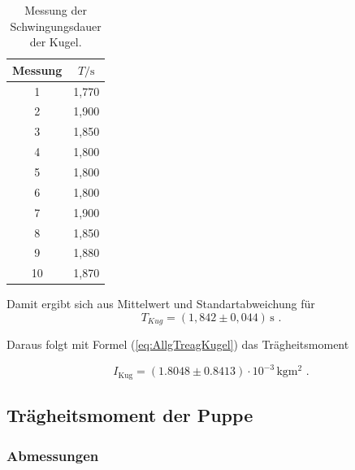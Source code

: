 \begin{table}[H]
  \centering
  \caption{Messung der Schwingungsdauer der Kugel.}
  \label{tab:SchwingungsdauerKugel}
  \begin{tabular}{c c}
    \toprule
    Messung &  $T / \unit\second$ \\
    \midrule
              1 &        1,770 \\
              2 &        1,900 \\
              3 &        1,850 \\
              4 &        1,800 \\
              5 &        1,800 \\
              6 &        1,800 \\
              7 &        1,900 \\
              8 &        1,850 \\
              9 &        1,880 \\
             10 &        1,870 \\
    \bottomrule
    \end{tabular}
\end{table}

Damit ergibt sich aus Mittelwert und Standartabweichung für
\begin{equation*}
  T_{Kug} = (1,842 \pm 0,044) \, \unit\second \text{ .}
\end{equation*}

Daraus folgt mit Formel (\ref{eq:AllgTreagKugel}) das Trägheitsmoment 

\begin{equation*}
  I_{\text{Kug}} = (1.8048 \pm 0.8413) \cdot 10^{-3} \, \unit{\kilo\gram\meter\squared} \text{ .}
\end{equation*}


\subsection{Trägheitsmoment der Puppe}

\subsubsection{Abmessungen}

